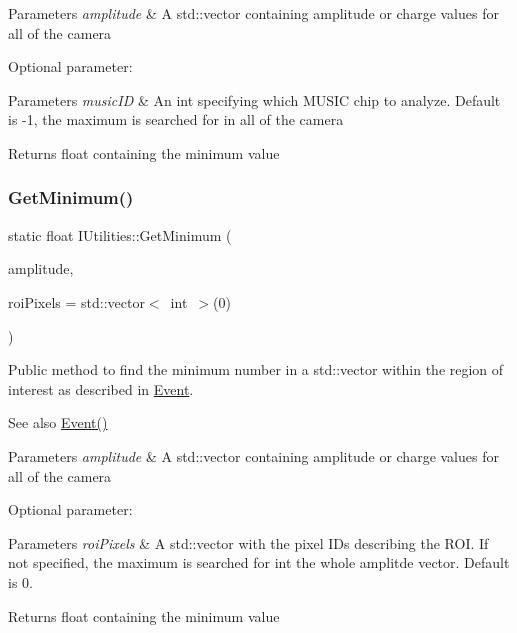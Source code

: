 \begin{DoxyParams}{Parameters}
{\em amplitude} & A std\+::vector containing amplitude or charge values for all of the camera\\
\hline
\end{DoxyParams}
Optional parameter\+: 
\begin{DoxyParams}{Parameters}
{\em music\+ID} & An int specifying which M\+U\+S\+IC chip to analyze. Default is -\/1, the maximum is searched for in all of the camera\\
\hline
\end{DoxyParams}
\begin{DoxyReturn}{Returns}
float containing the minimum value 
\end{DoxyReturn}
\mbox{\label{classIUtilities_ae3f9e408e055f71e9f08d2c12dec2117}} 
\subsubsection{\texorpdfstring{Get\+Minimum()}{GetMinimum()}\hspace{0.1cm}{\footnotesize\ttfamily [2/2]}}
{\footnotesize\ttfamily static float I\+Utilities\+::\+Get\+Minimum (\begin{DoxyParamCaption}\item[{std\+::vector$<$ float $>$}]{amplitude,  }\item[{std\+::vector$<$ int $>$}]{roi\+Pixels = {\ttfamily std\+:\+:vector$<$~int~$>$(0)} }\end{DoxyParamCaption})\hspace{0.3cm}{\ttfamily [static]}}



Public method to find the minimum number in a std\+::vector within the region of interest as described in \hyperlink{classEvent}{Event}. 

\begin{DoxySeeAlso}{See also}
\hyperlink{classEvent}{Event()}
\end{DoxySeeAlso}

\begin{DoxyParams}{Parameters}
{\em amplitude} & A std\+::vector containing amplitude or charge values for all of the camera\\
\hline
\end{DoxyParams}
Optional parameter\+: 
\begin{DoxyParams}{Parameters}
{\em roi\+Pixels} & A std\+::vector with the pixel I\+Ds describing the R\+OI. If not specified, the maximum is searched for int the whole amplitde vector. Default is 0.\\
\hline
\end{DoxyParams}
\begin{DoxyReturn}{Returns}
float containing the minimum value 
\end{DoxyReturn}
\mbox{\label{classIUtilities_ae7db5eec63bd72ddfd50aa0abbb03a6d}} 
